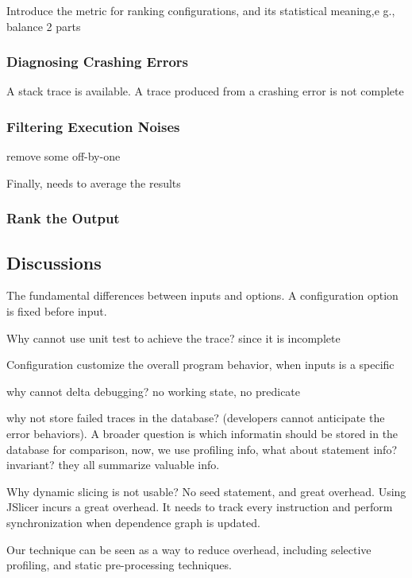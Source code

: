 Introduce the metric for ranking configurations, and its
statistical meaning,e g., balance 2 parts

\subsubsection{Diagnosing Crashing Errors}

A stack trace is available. A trace produced from a crashing error is not complete

\subsubsection{Filtering Execution Noises}

remove some off-by-one


Finally, needs to average the results
\subsubsection{Rank the Output}

\subsection{Discussions}

The fundamental differences between inputs and options. A configuration
option is fixed before input.

Why cannot use unit test to achieve the trace? since it is incomplete

Configuration customize the overall program behavior, when inputs is a specific

why cannot delta debugging? no working state, no predicate

why not store failed traces in the database? (developers
cannot anticipate the error behaviors). A broader question is which
informatin should be stored in the database for comparison, now, we use
profiling info, what about statement info? invariant? they all
summarize valuable info.

Why dynamic slicing is not usable? No seed statement, and great overhead. Using JSlicer incurs
a great overhead. It needs to track every instruction and
perform synchronization when dependence graph is updated.

Our technique can be seen as a way to reduce overhead,
including selective profiling, and static pre-processing
techniques.

